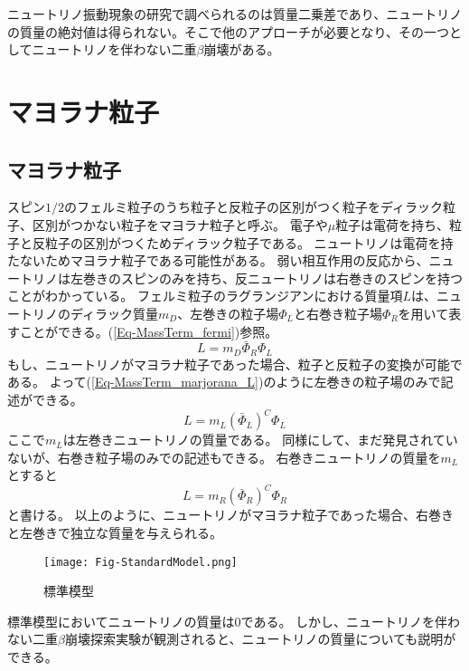\documentclass[a4paper,10pt]{jreport}
\begin{document}
ニュートリノ振動現象の研究で調べられるのは質量二乗差であり、ニュートリノの質量の絶対値は得られない。そこで他のアプローチが必要となり、その一つとしてニュートリノを伴わない二重$\beta$崩壊がある。



\section{マヨラナ粒子}



\subsection{マヨラナ粒子}

スピン$1/2$のフェルミ粒子のうち粒子と反粒子の区別がつく粒子をディラック粒子、区別がつかない粒子をマヨラナ粒子と呼ぶ。
電子や$\mu$粒子は電荷を持ち、粒子と反粒子の区別がつくためディラック粒子である。
ニュートリノは電荷を持たないためマヨラナ粒子である可能性がある。
弱い相互作用の反応から、ニュートリノは左巻きのスピンのみを持ち、反ニュートリノは右巻きのスピンを持つことがわかっている。
フェルミ粒子のラグランジアンにおける質量項$L$は、ニュートリノのディラック質量$m_D$、左巻きの粒子場$\Phi_L$と右巻き粒子場$\Phi_R$を用いて表すことができる。(\ref{Eq-MassTerm_fermi})参照。
\begin{equation} \label{Eq-MassTerm_fermi}
	L=m_D\bar{\Phi}_R\Phi_L
\end{equation}
もし、ニュートリノがマヨラナ粒子であった場合、粒子と反粒子の変換が可能である。
よって(\ref{Eq-MassTerm_marjorana_L})のように左巻きの粒子場のみで記述ができる。
\begin{equation} \label{Eq-MassTerm_marjorana_L}
	L=m_L(\bar{\Phi}_L)^C\Phi_L
\end{equation}
ここで$m_L$は左巻きニュートリノの質量である。
同様にして、まだ発見されていないが、右巻き粒子場のみでの記述もできる。
右巻きニュートリノの質量を$m_L$とすると
\begin{equation} \label{Eq-MassTerm_marjorana_R}
	L=m_R(\bar{\Phi}_R)^C\Phi_R
\end{equation}
と書ける。
以上のように、ニュートリノがマヨラナ粒子であった場合、右巻きと左巻きで独立な質量を与えられる。
\begin{figure}[H]
	\center
	\texttt{[image: Fig-StandardModel.png]}
	\caption{標準模型} \label{Fig-StandardModel}
\end{figure}
標準模型においてニュートリノの質量は0である。
しかし、ニュートリノを伴わない二重$\beta$崩壊探索実験が観測されると、ニュートリノの質量についても説明ができる。
\end{document}
